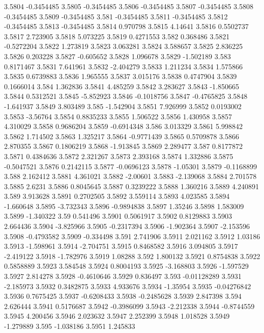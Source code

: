 3.5804  -0.3454485
3.5805  -0.3454485
3.5806  -0.3454485
3.5807  -0.3454485
3.5808  -0.3454485
3.5809  -0.3454485
3.581  -0.3454485
3.5811  -0.3454485
3.5812  -0.3454485
3.5813  -0.3454485
3.5814  0.970798
3.5815  4.14641
3.5816  0.5502737
3.5817  2.723905
3.5818  5.073225
3.5819  0.4271553
3.582  0.368486
3.5821  -0.5272204
3.5822  1.273819
3.5823  3.063281
3.5824  3.588657
3.5825  2.836225
3.5826  0.203228
3.5827  -0.605652
3.5828  1.096678
3.5829  -1.502189
3.583  0.8171467
3.5831  7.641961
3.5832  -2.404279
3.5833  1.211234
3.5834  1.575866
3.5835  0.6739883
3.5836  1.965555
3.5837  3.015176
3.5838  0.4747904
3.5839  0.1666014
3.584  1.362836
3.5841  4.485259
3.5842  3.283627
3.5843  -1.850665
3.5844  0.5312521
3.5845  -5.852923
3.5846  -0.1018756
3.5847  -0.4765825
3.5848  -1.641937
3.5849  3.803489
3.585  -1.542904
3.5851  7.926999
3.5852  0.0193002
3.5853  -3.56764
3.5854  0.8835233
3.5855  1.506522
3.5856  1.430958
3.5857  4.310029
3.5858  0.9686204
3.5859  -0.6914348
3.586  3.013329
3.5861  5.998842
3.5862  1.714502
3.5863  1.325217
3.5864  -0.9771439
3.5865  0.5709878
3.5866  2.870355
3.5867  0.1806219
3.5868  -1.913845
3.5869  2.289477
3.587  0.8177872
3.5871  0.4384636
3.5872  2.321267
3.5873  2.393168
3.5874  1.332886
3.5875  -0.5047521
3.5876  0.2142115
3.5877  -0.0696123
3.5878  -1.05301
3.5879  -0.1168899
3.588  2.162412
3.5881  4.361021
3.5882  -2.00601
3.5883  -2.139068
3.5884  2.701578
3.5885  2.6231
3.5886  0.8045645
3.5887  0.3239222
3.5888  1.360216
3.5889  4.240891
3.589  3.913628
3.5891  0.2702505
3.5892  3.559114
3.5893  4.023585
3.5894  -1.660648
3.5895  -3.732343
3.5896  -0.9894838
3.5897  1.35246
3.5898  1.583009
3.5899  -1.340322
3.59  0.541496
3.5901  0.5061917
3.5902  0.8129883
3.5903  2.664436
3.5904  -3.825966
3.5905  -0.2317394
3.5906  -1.902364
3.5907  -2.153596
3.5908  -0.4793582
3.5909  -0.334498
3.591  2.741906
3.5911  2.021162
3.5912  1.03186
3.5913  -1.598961
3.5914  -2.704751
3.5915  0.8468582
3.5916  3.094805
3.5917  -2.419122
3.5918  -1.782976
3.5919  1.08288
3.592  1.800132
3.5921  0.8754838
3.5922  0.5858889
3.5923  3.584548
3.5924  0.8004193
3.5925  -3.168803
3.5926  -1.597529
3.5927  2.814278
3.5928  -0.4610646
3.5929  0.836497
3.593  -0.01128289
3.5931  -2.185973
3.5932  0.3482875
3.5933  4.933676
3.5934  -1.35954
3.5935  -0.04276842
3.5936  0.7675425
3.5937  -0.6208433
3.5938  -0.2485628
3.5939  2.847398
3.594  2.626444
3.5941  0.5176687
3.5942  -0.3986099
3.5943  -2.212338
3.5944  -0.8744559
3.5945  4.200456
3.5946  2.023632
3.5947  2.252399
3.5948  1.018528
3.5949  -1.279889
3.595  -1.038186
3.5951  1.245833
